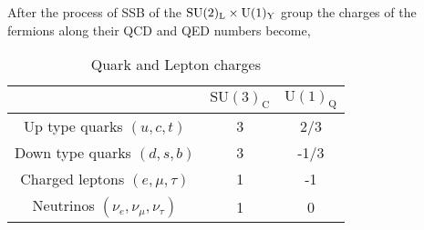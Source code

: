 % 
After the process of SSB of the $\mathrm{SU(2)_L} \times \mathrm{U}(1)_{\mathrm{Y}}$ group the charges of the fermions along their QCD and QED numbers become, 
%
\begin{table}[H]
\caption{Quark and Lepton charges}
\centering
\begin{tabular}{ccc}
  \hline & $\mathrm{SU(3)_C}$ & $\mathrm{U(1)_Q}$ \\
  \hline 
Up type quarks $(u,c,t)$ & 3 & 2/3 \\
Down type quarks $(d,s,b)$ & 3 & -1/3 \\
Charged leptons $(e,\mu,\tau)$ & 1 & -1 \\
Neutrinos  $(\nu_e,\nu_\mu,\nu_\tau)$  & 1 & 0 \\
  \hline	
\end{tabular}
\end{table}

